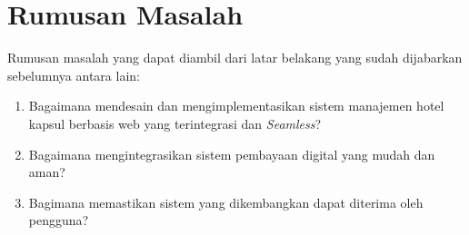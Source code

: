\section{Rumusan Masalah}
Rumusan masalah yang dapat diambil dari latar belakang yang sudah dijabarkan
sebelumnya antara lain:
\begin{enumerate}
    \item Bagaimana mendesain dan mengimplementasikan sistem manajemen hotel kapsul berbasis web yang terintegrasi dan \textit{Seamless}?
    \item Bagaimana mengintegrasikan sistem pembayaan digital yang mudah dan aman?
    \item Bagimana memastikan sistem yang dikembangkan dapat diterima oleh pengguna?
\end{enumerate}



% 
